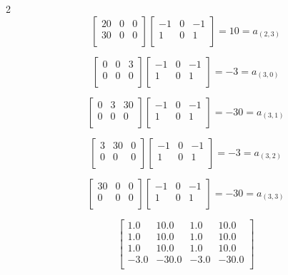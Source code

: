 \documentclass[11pt]{article}
\theoremstyle{plain}
\begin{document}
\begin{multicols}{2}
\[
	\begin{bmatrix}
		20 & 0 & 0 \\
		30 & 0 & 0 \\
	\end{bmatrix}
	\begin{bmatrix}
		-1 & 0 & -1 \\
		1  & 0 & 1  \\
	\end{bmatrix}
	= 10 = a_{(2,3)}
\]

\[
	\begin{bmatrix}
		0 & 0 & 3 \\
		0 & 0 & 0 \\
	\end{bmatrix}
	\begin{bmatrix}
		-1 & 0 & -1 \\
		1  & 0 & 1  \\
	\end{bmatrix}
	= -3 = a_{(3,0)}
\]

\[
	\begin{bmatrix}
		0 & 3 & 30 \\
		0 & 0 & 0  \\
	\end{bmatrix}
	\begin{bmatrix}
		-1 & 0 & -1 \\
		1  & 0 & 1  \\
	\end{bmatrix}
	= -30 = a_{(3,1)}
\]

\[
	\begin{bmatrix}
		3 & 30 & 0 \\
		0 & 0  & 0 \\
	\end{bmatrix}
	\begin{bmatrix}
		-1 & 0 & -1 \\
		1  & 0 & 1  \\
	\end{bmatrix}
	= -3 = a_{(3,2)}
\]

\[
	\begin{bmatrix}
		30 & 0 & 0 \\
		0  & 0 & 0 \\
	\end{bmatrix}
	\begin{bmatrix}
		-1 & 0 & -1 \\
		1  & 0 & 1  \\
	\end{bmatrix}
	= -30 = a_{(3,3)}
\]

\end{multicols}
\[
	\begin{bmatrix}
		1.0  & 10.0  & 1.0  & 10.0  \\
		1.0  & 10.0  & 1.0  & 10.0  \\
		1.0  & 10.0  & 1.0  & 10.0  \\
		-3.0 & -30.0 & -3.0 & -30.0 \\
	\end{bmatrix}
\]
\end{document}
